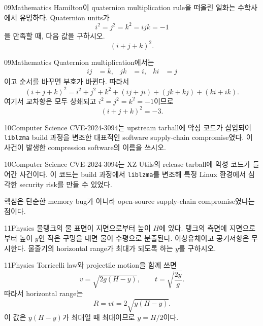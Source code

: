 \documentclass[12pt,aspectratio=169]{beamer}
\begin{document}
\begin{problemframe}{09}{Mathematics}
Hamilton이 quaternion multiplication rule을 떠올린 일화는 수학사에서 유명하다. Quaternion units가
\[
i^2=j^2=k^2=ijk=-1
\]
을 만족할 때, 다음 값을 구하시오.
\[
(i+j+k)^2.
\]
\end{problemframe}

\begin{solutionframe}{09}{Mathematics}
Quaternion multiplication에서는
\[
\begin{aligned}
ij&=k, & jk&=i, & ki&=j
\end{aligned}
\]
이고 순서를 바꾸면 부호가 바뀐다. 따라서
\[
(i+j+k)^2=i^2+j^2+k^2+(ij+ji)+(jk+kj)+(ki+ik).
\]
여기서 교차항은 모두 상쇄되고 $i^2=j^2=k^2=-1$이므로
\[
(i+j+k)^2=-3.
\]
\end{solutionframe}

\begin{problemframe}{10}{Computer Science}
CVE-2024-3094는 upstream tarball에 악성 코드가 삽입되어 \texttt{liblzma} build 과정을 변조한 대표적인 software supply-chain compromise였다. 이 사건이 발생한 compression software의 이름을 쓰시오.
\end{problemframe}

\begin{solutionframe}{10}{Computer Science}
CVE-2024-3094는 XZ Utils의 release tarball에 악성 코드가 들어간 사건이다. 이 코드는 build 과정에서 \texttt{liblzma}를 변조해 특정 Linux 환경에서 심각한 security risk를 만들 수 있었다.

핵심은 단순한 memory bug가 아니라 open-source supply-chain compromise였다는 점이다.
\end{solutionframe}

\begin{problemframe}{11}{Physics}
물탱크의 물 표면이 지면으로부터 높이 $H$에 있다. 탱크의 측면에 지면으로부터 높이 $y$인 작은 구멍을 내면 물이 수평으로 분출된다. 이상유체이고 공기저항은 무시한다. 물줄기의 horizontal range가 최대가 되도록 하는 $y$를 구하시오.
\end{problemframe}

\begin{solutionframe}{11}{Physics}
Torricelli law와 projectile motion을 함께 쓰면
\[
v=\sqrt{2g(H-y)},\qquad t=\sqrt{\frac{2y}{g}}.
\]
따라서 horizontal range는
\[
R=vt=2\sqrt{y(H-y)}.
\]
이 값은 $y(H-y)$가 최대일 때 최대이므로 $y=H/2$이다.
\end{solutionframe}
\end{document}
